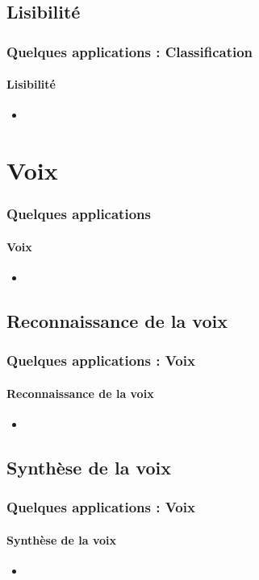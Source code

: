 \documentclass[xcolor=table]{beamer}
\begin{document}
\subsection{Lisibilité}

\begin{frame}
	\frametitle{Quelques applications : Classification}
	\framesubtitle{Lisibilité}
	\begin{itemize}
		\item 
	\end{itemize}
\end{frame}


\section{Voix}

\begin{frame}
	\frametitle{Quelques applications}
	\framesubtitle{Voix}
	\begin{itemize}
		\item 
	\end{itemize}
\end{frame}

\subsection{Reconnaissance de la voix}

\begin{frame}
	\frametitle{Quelques applications : Voix}
	\framesubtitle{Reconnaissance de la voix}
	\begin{itemize}
		\item 
	\end{itemize}
\end{frame}

\subsection{Synthèse de la voix}

\begin{frame}
	\frametitle{Quelques applications : Voix}
	\framesubtitle{Synthèse de la voix}
	\begin{itemize}
		\item 
	\end{itemize}
\end{frame}


\end{document}
